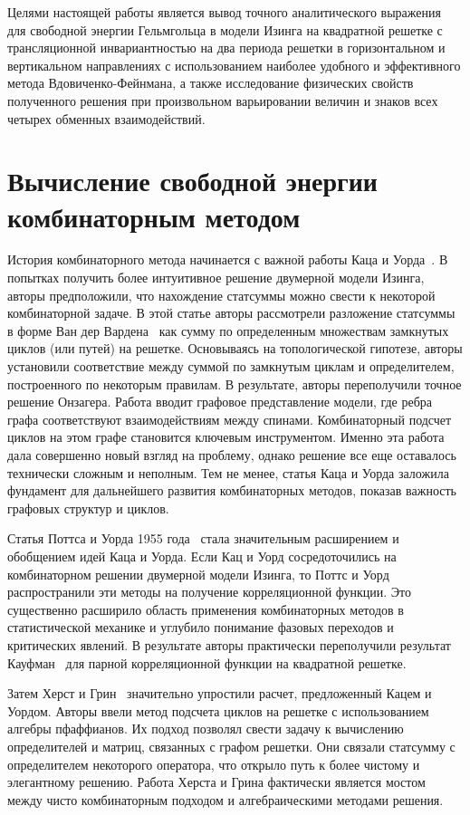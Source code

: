 \documentclass[utf8,12pt]{jetp}
\begin{document}
Целями настоящей работы является вывод точного аналитического выражения для свободной энергии Гельмгольца в модели Изинга на квадратной решетке с трансляционной инвариантностью на два периода решетки в горизонтальном и вертикальном направлениях с использованием наиболее удобного и эффективного метода Вдовиченко-Фейнмана, а также исследование физических свойств полученного решения при произвольном варьировании величин и знаков всех четырех обменных взаимодействий.

\section{Вычисление свободной энергии комбинаторным методом}

История комбинаторного метода начинается с важной работы Каца и Уорда~\cite{kac1952}. В попытках получить более интуитивное решение двумерной модели Изинга, авторы предположили, что нахождение статсуммы можно свести к некоторой комбинаторной задаче. В этой статье авторы рассмотрели разложение статсуммы в форме Ван дер Вардена~\cite{warden1941} как сумму по определенным множествам замкнутых циклов (или путей) на решетке. Основываясь на топологической гипотезе, авторы установили соответствие между суммой по замкнутым циклам и определителем, построенного по некоторым правилам. В результате, авторы переполучили точное решение Онзагера. Работа вводит графовое представление модели, где ребра графа соответствуют взаимодействиям между спинами. Комбинаторный подсчет циклов на этом графе становится ключевым инструментом. Именно эта работа дала совершенно новый взгляд на проблему, однако решение все еще оставалось технически сложным и неполным. Тем не менее, статья Каца и Уорда заложила фундамент для дальнейшего развития комбинаторных методов, показав важность графовых структур и циклов. 

Статья Поттса и Уорда 1955 года~\cite{potts1955} стала значительным расширением и обобщением идей Каца и Уорда. Если Кац и Уорд сосредоточились на комбинаторном решении двумерной модели Изинга, то Поттс и Уорд распространили эти методы на получение корреляционной функции. Это существенно расширило область применения комбинаторных методов в статистической механике и углубило понимание фазовых переходов и критических явлений. В результате авторы практически переполучили результат Кауфман~\cite{kaufman1949} для парной корреляционной функции на квадратной решетке.

Затем Херст и Грин~\cite{hurst1960} значительно упростили расчет, предложенный Кацем и Уордом. Авторы ввели метод подсчета циклов на решетке с использованием алгебры пфаффианов. Их подход позволял свести задачу к вычислению определителей и матриц, связанных с графом решетки. Они связали статсумму с определителем некоторого оператора, что открыло путь к более чистому и элегантному решению. Работа Херста и Грина фактически является мостом между чисто комбинаторным подходом и алгебраическими методами решения.
 
\end{document}

